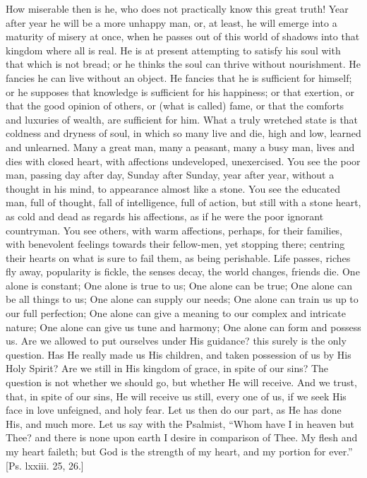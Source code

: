 How miserable then is he, who does not practically know this great
truth! Year after year he will be a more unhappy man, or, at least, he
will emerge into a maturity of misery at once, when he passes out of
this world of shadows into that kingdom where all is real. He is at
present attempting to satisfy his soul with that which is not bread;
or he thinks the soul can thrive without nourishment. He fancies he
can live without an object. He fancies that he is sufficient for
himself; or he supposes that knowledge is sufficient for his
happiness; or that exertion, or that the good opinion of others, or
(what is called) fame, or that the comforts and luxuries of wealth,
are sufficient for him. What a truly wretched state is that coldness
and dryness of soul, in which so many live and die, high and low,
learned and unlearned. Many a great man, many a peasant, many a busy
man, lives and dies with closed heart, with affections undeveloped,
unexercised. You see the poor man, passing day after day, Sunday after
Sunday, year after year, without a thought in his mind, to appearance
almost like a stone. You see the educated man, full of thought, fall
of intelligence, full of action, but still with a stone heart, as cold
and dead as regards his affections, as if he were the poor ignorant
countryman. You see others, with warm affections, perhaps, for their
families, with benevolent feelings towards their fellow-men, yet
stopping there; centring their hearts on what is sure to fail them, as
being perishable. Life passes, riches fly away, popularity is fickle,
the senses decay, the world changes, friends die. One alone is
constant; One alone is true to us; One alone can be true; One alone
can be all things to us; One alone can supply our needs; One alone can
train us up to our full perfection; One alone can give a meaning to
our complex and intricate nature; One alone can give us tune and
harmony; One alone can form and possess us. Are we allowed to put
ourselves under His guidance? this surely is the only question. Has He
really made us His children, and taken possession of us by His Holy
Spirit? Are we still in His kingdom of grace, in spite of our sins?
The question is not whether we should go, but whether He will receive.
And we trust, that, in spite of our sins, He will receive us still,
every one of us, if we seek His face in love unfeigned, and holy fear.
Let us then do our part, as He has done His, and much more. Let us say
with the Psalmist, ``Whom have I in heaven but Thee? and there is
none upon earth I desire in comparison of Thee. My flesh and my heart
faileth; but God is the strength of my heart, and my portion for
ever.'' [Ps. lxxiii. 25, 26.]

